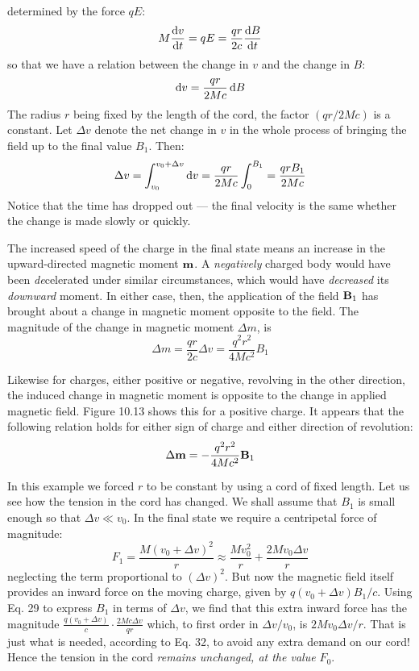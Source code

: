 determined by the force $qE$:
\begin{equation}
  M \frac{\operatorname{d\!} v}{\operatorname{d\!} t} = qE = \frac{qr}{2c} \frac{\operatorname{d\!} B}{\operatorname{d\!} t}
\end{equation}
so that we have a relation between the change in $v$ and the change
in $B$:
\begin{equation}
  \operatorname{d\!} v = \frac{qr}{2Mc} \operatorname{d\!} B
\end{equation}
The radius $r$ being fixed by the length of the cord, the factor $(qr/2Mc)$
is a constant. Let $\Delta v$ denote the net change in $v$ in the whole process
of bringing the field up to the final value $B_1$. Then:
\begin{equation}
  \Delta v = \int_{v_0}^{v_0+\Delta v}\operatorname{d\!} v = \frac{qr}{2Mc} \int_0^{B_1} = \frac{qrB_1}{2Mc}
\end{equation}
Notice that the time has dropped out --- the final velocity is the same
whether the change is made slowly or quickly.

The increased speed of the charge in the final state means an increase
in the upward-directed magnetic moment $\mathbf{m}$. A \emph{negatively}
charged body would have been \emph{de}celerated under similar 
circumstances, which would have \emph{decreased} its \emph{downward} moment. In
either case, then, the application of the field $\mathbf{B}_1$ has brought about
a change in magnetic moment opposite to the field. The magnitude
of the change in magnetic moment $\Delta m$, is
\begin{equation}
  \Delta m = \frac{qr}{2c} \Delta v = \frac{q^2r^2}{4Mc^2} B_1
\end{equation}

Likewise for charges, either positive or negative, revolving in the
other direction, the induced change in magnetic moment is opposite
to the change in applied magnetic field. Figure 10.13 shows this for
a positive charge. It appears that the following relation holds for
either sign of charge and either direction of revolution:
\begin{equation}
  \Delta\mathbf{m} = -\frac{q^2r^2}{4Mc^2} \mathbf{B}_1
\end{equation}

In this example we forced $r$ to be constant by using a cord of fixed
length. Let us see how the tension in the cord has changed. We
shall assume that $B_1$ is small enough so that $\Delta v \ll v_0$. In the final
state we require a centripetal force of magnitude:
\begin{equation}
  F_1 = \frac{M(v_0+\Delta v)^2}{r} \approx \frac{Mv_0^2}{r} + \frac{2Mv_0\Delta v}{r}  
\end{equation}
neglecting the term proportional to $(\Delta v)^2$. But now the magnetic
field itself provides an inward force on the moving charge, given by
$q(v_0 + \Delta v)B_1/c$. Using Eq. 29 to express $B_1$ in terms of $\Delta v$, we find
that this extra inward force has the magnitude
$\frac{q(v_0+\Delta v)}{c}\cdot\frac{2Mc\Delta v}{qr}$
which, to first order in $\Delta v/v_0$, is $2Mv_0 \Delta v/r$. That is just what is
needed, according to Eq. 32, to avoid any extra demand on our cord!
Hence the tension in the cord \emph{remains unchanged, at the value $F_0$}.

